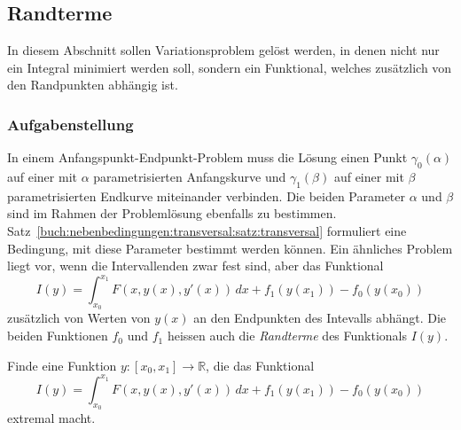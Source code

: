 %
%
\subsection{Randterme
\label{buch:nebenbedingungen:transversal:subsection:randterme}}
In diesem Abschnitt sollen Variationsproblem gelöst werden, in denen
nicht nur ein Integral minimiert werden soll, sondern ein Funktional,
welches zusätzlich von den Randpunkten abhängig ist.

%
%
\subsubsection{Aufgabenstellung}
In einem Anfangspunkt-Endpunkt-Problem muss die Lösung einen Punkt
$\gamma_0(\alpha)$ auf einer mit $\alpha$ parametrisierten Anfangskurve
und $\gamma_1(\beta)$ auf einer mit $\beta$ parametrisierten Endkurve
miteinander verbinden.
Die beiden Parameter $\alpha$ und $\beta$ sind im Rahmen der Problemlösung
ebenfalls zu bestimmen.
Satz~\ref{buch:nebenbedingungen:transversal:satz:transversal}
formuliert eine Bedingung, mit diese Parameter bestimmt werden können.
Ein ähnliches Problem liegt vor, wenn die Intervallenden zwar fest sind,
aber das Funktional
\[
I(y)
=
\int_{x_0}^{x_1}
F(x,y(x),y'(x))
\,dx
+
f_1(y(x_1))
-
f_0(y(x_0))
\]
zusätzlich von Werten von $y(x)$ an den Endpunkten des Intevalls
abhängt.
Die beiden Funktionen $f_0$ und $f_1$ heissen auch die {\em Randterme}
%
des Funktionals $I(y)$.

\begin{aufgabe}
\label{buch:nebenbedingungen:transversal:aufgabe:randterme}
Finde eine Funktion $y\colon[x_0,x_1]\to\mathbb{R}$, die das Funktional
\begin{equation}
I(y)
=
\int_{x_0}^{x_1}
F(x,y(x),y'(x))\,dx
+
f_1(y(x_1))
-
f_0(y(x_0))
\label{buch:nebenbedingungen:transversal:eqn:randterme}
\end{equation}
extremal macht.
\end{aufgabe}

%
%
